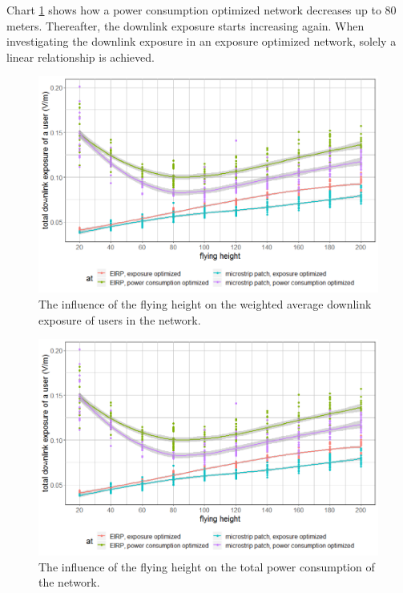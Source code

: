 Chart \ref{fig:s3fhvsdl} shows how a power consumption optimized network decreases up to 80 meters. Thereafter, 
the downlink exposure starts increasing again. When investigating the downlink exposure in an exposure 
optimized network, solely a linear relationship is achieved. 


\begin{figure}[]
  \includegraphics[width=\textwidth]{../results/s3/fhvsdl.png}
  \caption{The influence of the flying height on the weighted average downlink exposure of users in the network.}
  \label{fig:s3fhvsdl}
\end{figure}

\begin{figure}[]
  \includegraphics[width=\textwidth]{../results/s3/fhvsdl.png}
  \caption{The influence of the flying height on the total power consumption of the network.}
  \label{fig:s3fhvspc}
\end{figure}

